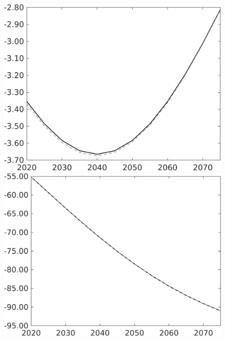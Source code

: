\documentclass[12pt]{article}
\begin{document}
\begin{figure}[h!!]
\begin{minipage}[]{0.32\textwidth}
	\end{minipage}	
	\begin{minipage}[]{0.32\textwidth}
		\includegraphics[width=1\textwidth]{../../codding_model/own_basedOnFried/optimalPol_010922_revision/figures/all_13Sept22/PerdifNoTauf_Equlab_regime0_CompTaul_C_spillover0_nsk0_xgr1_knspil1_sep1_LFlimit0_emsbase0_countec0_GovRev0_etaa0.79_lgd0.png}
	\end{minipage}	
	\begin{minipage}[]{0.32\textwidth}
		\includegraphics[width=1\textwidth]{../../codding_model/own_basedOnFried/optimalPol_010922_revision/figures/all_13Sept22/PerdifNoTauf_Equlab_regime0_CompTaul_F_spillover0_nsk0_xgr1_knspil1_sep1_LFlimit0_emsbase0_countec0_GovRev0_etaa0.79_lgd0.png}

\end{minipage}
\end{figure}
\end{document}
